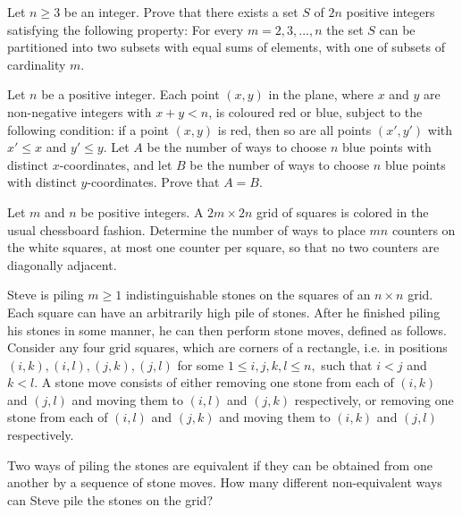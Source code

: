 \documentclass{article}
\begin{document}


\begin{req}[IMO 1987/1]{3}
Let $p_n (k)$ be the number of permutations of the set $\{ 1, \ldots , n \} , \; n \ge 1$, which have exactly $k$ fixed points. Prove that

\[\sum_{k=0}^{n} k \cdot p_n (k) = n!.\]}

\begin{req}[AIME 1994/11]{6}

\end{req
\end{req}

\begin{prob}[ISL 2018/C1]{9}
Let $n\geq 3$ be an integer. Prove that there exists a set $S$ of $2n$ positive integers satisfying the following property: For every $m=2,3,...,n$ the set $S$ can be partitioned into two subsets with equal sums of elements, with one of subsets of cardinality $m.$
\end{prob}

\begin{prob}[IMO 2002/1]{9}
Let $n$ be a positive integer. Each point $(x,y)$ in the plane, where $x$ and $y$ are non-negative integers with $x+y<n$, is coloured red or blue, subject to the following condition: if a point $(x,y)$ is red, then so are all points $(x',y')$ with $x'\leq x$ and $y'\leq y$. Let $A$ be the number of ways to choose $n$ blue points with distinct $x$-coordinates, and let $B$ be the number of ways to choose $n$ blue points with distinct $y$-coordinates. Prove that $A=B$.
\end{prob}

\begin{prob}[CMO 2019/3]{13}
Let $m$ and $n$ be positive integers. A $2m\times 2n$ grid of squares is colored in the usual chessboard fashion. Determine the number of ways to place $mn$ counters on the white squares, at most one counter per square, so that no two counters are diagonally adjacent.
\end{prob}

\begin{prob}[USAMO 2015/4]{13}
Steve is piling $m \geq 1$ indistinguishable stones on the squares of an $n \times n$ grid. Each square can have an arbitrarily high pile of stones. After he finished piling his stones in some manner, he can then perform stone moves, defined as follows. Consider any four grid squares, which are corners of a rectangle, i.e. in positions $(i, k),(i, l),(j, k),(j, l)$ for some $1 \leq i, j, k, l \leq n,$ such that $i<j$ and $k<l .$ A stone move consists of either removing one stone from each of $(i, k)$ and $(j, l)$ and moving them to $(i, l)$ and $(j, k)$ respectively, or removing one stone from each of $(i, l)$ and $(j, k)$ and moving them to $(i, k)$ and $(j, l)$ respectively.

Two ways of piling the stones are equivalent if they can be obtained from one another by a sequence of stone moves. How many different non-equivalent ways can Steve pile the stones on the grid?
\end{prob}
\end{document}
